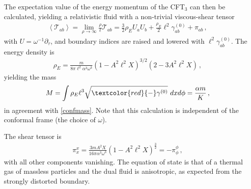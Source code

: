 \documentclass[
twoside,
openright,
frontopenright,
]{dmathesis}
\newcommand{\tcr}{\textcolor{red}}
\begin{document}
The expectation value of the energy momentum of the CFT$_{3}$
can then be calculated,
yielding a relativistic fluid with a non-trivial viscous-shear tensor
\begin{align}
\left\langle \mathcal{T}_{ab}\right\rangle =\lim_{\rho \longrightarrow
\infty }\frac{\rho }{\ell}\mathcal{T}_{ab}= \frac32 \rho _{E}
U_{a}U_{b}+\frac{\rho_E}2 \ell^{2} \gamma^{(0)} _{ab}+\pi _{ab}\,,
\end{align}
with $U=\omega^{-1}\partial_\tau$, and boundary indices are
raised and lowered with $\ell^{2}\gamma^{(0)}_{ab}$.
The energy density is
\begin{align}
\rho _{E}= \frac{m}{8\pi\ell^2 \alpha^3\omega^3}(1-A^2\ell^2 X)^{3/2}
(2-3A^{2}\ell^{2}X)\,,
\end{align}
yielding the mass
\begin{align}
M= \int \rho _{E} \ell^3 \sqrt{\tcr{-}\gamma^{(0)}}~dxd\phi
=\frac{\alpha m}{K}\,,
\end{align}
in agreement with \eqref{confmass}. Note that this calculation is independent
of the conformal frame (the choice of $\omega$).

The shear tensor is
\begin{align}
\pi^x_x= \frac{3mA^{2}X}{16\pi \alpha^3\omega^{3}}\left(
1-A^{2}\ell^{2}X\right) ^{\frac32}=-\pi^\phi_\phi\,,
\end{align}
with all other components  vanishing.
The equation of state is that of a thermal gas of massless particles
and the dual fluid is anisotropic,
as expected from the strongly distorted boundary.
\end{document}
